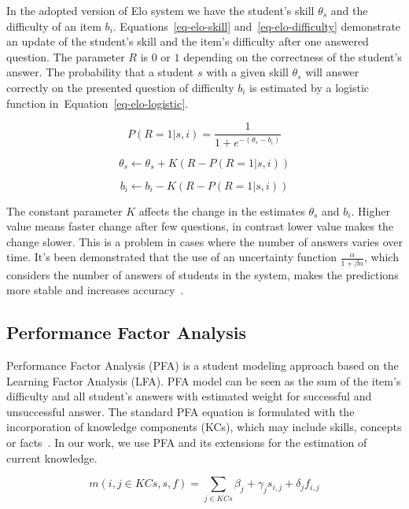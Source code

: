 In the adopted version of Elo system we have the student's skill $\theta_s$ and the difficulty of an item $b_i$. Equations~\ref{eq-elo-skill} and~\ref{eq-elo-difficulty} demonstrate an update of the student's skill and the item's difficulty after one answered question. The parameter $R$ is $0$ or $1$ depending on the correctness of the student's answer. The probability that a student $s$ with a given skill $\theta_s$ will answer correctly on the presented question of difficulty $b_i$ is estimated by a logistic function in~Equation~\ref{eq-elo-logistic}.

\begin{equation} \label{eq-elo-logistic}
  P(R = 1|s,i) = \frac{1}{1 + e^{-(\theta_s - b_i)}}
\end{equation}

\begin{equation} \label{eq-elo-skill}
  \theta_s \gets \theta_s + K(R - P(R = 1|s,i))
\end{equation}

\begin{equation} \label{eq-elo-difficulty}
  b_i \gets b_i - K(R - P(R = 1|s,i))
\end{equation}

The constant parameter $K$ affects the change in the estimates $\theta_s$ and $b_i$. Higher value means faster change after few questions, in contrast lower value makes the change slower. This is a problem in cases where the number of answers varies over time. It's been demonstrated that the use of an uncertainty function $\frac{\alpha}{1 + \beta n}$, which considers the number of answers of students in the system, makes the predictions more stable and increases accuracy~\cite{Vanek2014}.

\subsection{Performance Factor Analysis}
\label{pfa}

Performance Factor Analysis (PFA) is a student modeling approach based on the Learning Factor Analysis (LFA). PFA model can be seen as the sum of the item's difficulty and all student's answers with estimated weight for successful and unsuccessful answer. The standard PFA equation is formulated with the incorporation of knowledge components (KCs), which may include skills, concepts or facts~\cite{Pavlik2009}. In our work, we use PFA and its extensions for the estimation of current knowledge.

\begin{equation} \label{eq-pfa-standard}
  m(i,j \in KCs,s,f) = \sum_{j \in KCs} \beta_j + \gamma_j s_{i,j} + \delta_j f_{i,j} 
\end{equation}

